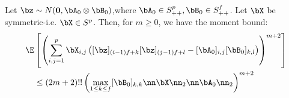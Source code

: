 \begin{lemma} \label{Isserlis_bound}
	Let $\bz \sim N(\mathbf{0},\bA_0\otimes \bB_0)$,where $\bA_0\in S_{++}^p, \bB_0\in S_{++}^f$. Let $\bX$ be symmetric-i.e. $\bX \in S^p$. Then, for $m\geq 0$, we have the moment bound:
	\begin{align*}
		\E & \left[ \left( \sum_{i,j=1}^p \bX_{i,j} \left([\bz]_{(i-1)f+k}[\bz]_{(j-1)f+l}-[\bA_0]_{i,j}[\bB_0]_{k,l}  \right) \right)^{m+2} \right] \\
			&\leq (2m+2)!! \left( \max_{1\leq k\leq f} [\bB_0]_{k,k} \nn\bX\nn_2 \nn\bA_0\nn_2 \right)^{m+2}
	\end{align*}
\end{lemma}

